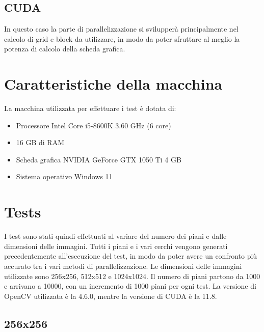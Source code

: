 \documentclass[11pt]{article}
\begin{document}
    \subsection{CUDA}\label{subsec:cuda}
    In questo caso la parte di parallelizzazione si svilupperà principalmente nel calcolo di grid e block da utilizzare,
    in modo da poter sfruttare al meglio la potenza di calcolo della scheda grafica.
    

    \section{Caratteristiche della macchina}\label{sec:caratteristiche-della-macchina}
    La macchina utilizzata per effettuare i test è dotata di:
    \begin{itemize}
        \item Processore Intel Core i5-8600K 3.60 GHz (6 core)
        \item 16 GB di RAM
        \item Scheda grafica NVIDIA GeForce GTX 1050 Ti 4 GB
        \item Sistema operativo Windows 11
    \end{itemize}

    \section{Tests}\label{sec:tests}
    I test sono stati quindi effettuati al variare del numero dei piani e dalle dimensioni delle immagini.
    Tutti i piani e i vari cerchi vengono generati precedentemente all'esecuzione del test, in modo da poter avere
    un confronto più accurato tra i vari metodi di parallelizzazione.
    Le dimensioni delle immagini utilizzate sono 256x256, 512x512 e 1024x1024.
    Il numero di piani partono da 1000 e arrivano a 10000, con un incremento di 1000 piani per ogni test.
    La versione di OpenCV utilizzata è la 4.6.0, mentre la versione di CUDA è la 11.8.

    \subsection{256x256}\label{subsec:256x256}
\end{document}

